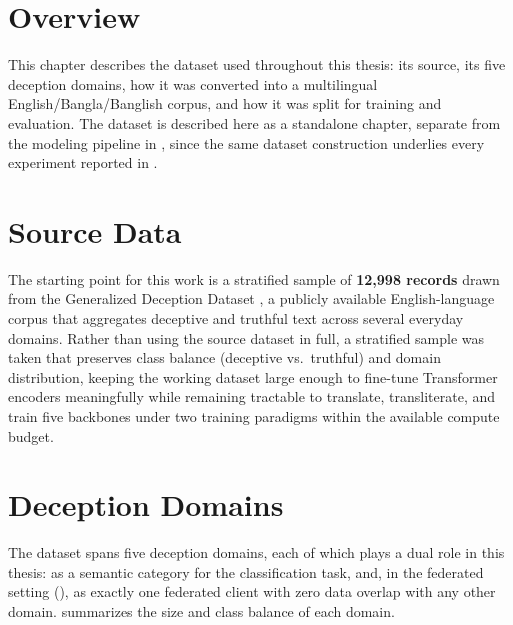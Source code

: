 \section{Overview}

This chapter describes the dataset used throughout this thesis: its source, its five deception domains, how it was converted into a multilingual English/Bangla/Banglish corpus, and how it was split for training and evaluation. The dataset is described here as a standalone chapter, separate from the modeling pipeline in , since the same dataset construction underlies every experiment reported in .

\section{Source Data}
\label{sec:dataset-source}

The starting point for this work is a stratified sample of \textbf{12{,}998 records} drawn from the Generalized Deception Dataset \cite{zeng2022generalized}, a publicly available English-language corpus that aggregates deceptive and truthful text across several everyday domains. Rather than using the source dataset in full, a stratified sample was taken that preserves class balance (deceptive vs.\ truthful) and domain distribution, keeping the working dataset large enough to fine-tune Transformer encoders meaningfully while remaining tractable to translate, transliterate, and train five backbones under two training paradigms within the available compute budget.

\section{Deception Domains}
\label{sec:dataset-domains}

The dataset spans five deception domains, each of which plays a dual role in this thesis: as a semantic category for the classification task, and, in the federated setting (), as exactly one federated client with zero data overlap with any other domain.  summarizes the size and class balance of each domain.

